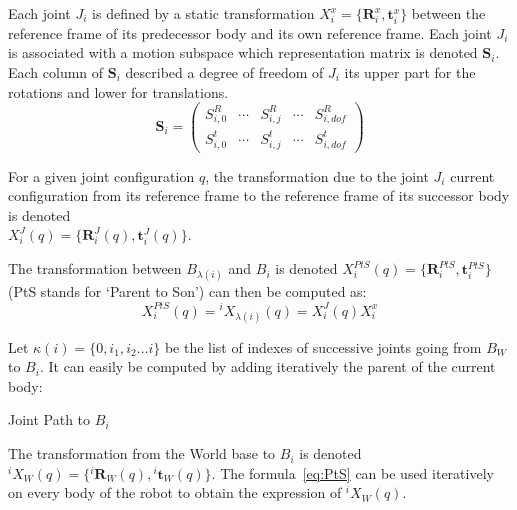 Each joint $J_i$ is defined by a static transformation $X^x_i = \{\mathbf{R}^x_i, \mathbf{t}^x_i\}$ between the reference frame of its predecessor body and its own reference frame.
Each joint $J_i$ is associated with a motion subspace which representation matrix is denoted $\mathbf{S}_i$. Each column of $\mathbf{S}_i$ described a degree of freedom of $J_i$ its upper part for the rotations and lower for translations.
\begin{equation}
  \mathbf{S}_i =
  \begin{pmatrix}
    S^R_{i,0} & \cdots &
    S^R_{i,j} & \cdots &
    S^R_{i,dof} \\
    S^t_{i,0} & \cdots &
    S^t_{i,j} & \cdots &
    S^t_{i,dof}
  \end{pmatrix}
\end{equation}

For a given joint configuration $q$, the transformation due to the joint $J_i$ current configuration from its reference frame to the reference frame of its successor body is denoted \\$X^J_i (q) = \{\mathbf{R}^J_i (q), \mathbf{t}^J_i (q)\}$.

The transformation between $B_{\lambda(i)}$ and $B_i$ is denoted $X^{PtS}_i (q) = \{\mathbf{R}^{PtS}_i, \mathbf{t}^{PtS}_i\}$ (PtS stands for `Parent to Son') can then be computed as:
\begin{equation}
  {X}^{PtS}_i (q) = {}^{i}X_{\lambda (i)} (q) = X^J_i (q) X^x_i
  \label{eq:PtS}
\end{equation}

Let $\kappa (i) =\{0, i_1, i_2 \ldots i\}$ be the list of indexes of successive joints going from $B_W$ to $B_i$.
It can easily be computed by adding iteratively the parent of the current body:

\begin{algorithm}
  \caption{Joint Path to $B_i$}
\label{JP}
\begin{algorithmic}
  \EndWhile{}
\end{algorithmic}
\end{algorithm}

The transformation from the World base to $B_i$ is denoted \\ ${}^i X_W (q) = \{{}^i \mathbf{R}_W (q), {}^i \mathbf{t}_W (q)\}$.
The formula~\ref{eq:PtS} can be used iteratively on every body of the robot to obtain the expression of ${}^i X_W (q)$.

